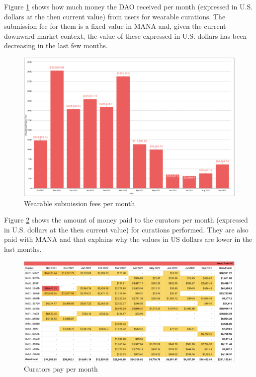 \documentclass[MSE,Master,english]{twbook}%
\begin{document}
Figure \ref{fig:submission_fees} shows how much money the DAO received per month (expressed in U.S. dollars at the then current value) from users for wearable curations. The submission fee for them is a fixed value in MANA and, given the current downward market context, the value of these expressed in U.S. dollars has been decreasing in the last few months.
\begin{figure}[H]
  \centering
  \includegraphics[width=\textwidth]{metrics/submission_fees.png}
  \caption{Wearable submission fees per month}
  \label{fig:submission_fees}
\end{figure}

Figure \ref{fig:curators_pay} shows the amount of money paid to the curators per month (expressed in U.S. dollars at the then current value) for curations performed. They are also paid with MANA and that explains why the values in US dollars are lower in the last months.
\begin{figure}[H]
  \centering
  \includegraphics[width=\textwidth]{metrics/curators_pay.png}
  \caption{Curators pay per month}
  \label{fig:curators_pay}
\end{figure}
\end{document}
